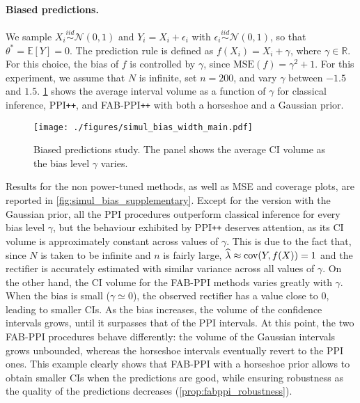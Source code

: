 \paragraph{Biased predictions.}
We sample $X_i \overset{iid}{\sim} \mathcal{N}(0,1)$ and $Y_i = X_i + \epsilon_i$ with $\epsilon_i \overset{iid}{\sim} \mathcal{N}(0, 1)$, so that $\theta^* = \mathbb{E}[Y] = 0$.
The prediction rule is defined as $f(X_i) = X_i + \gamma$, where $\gamma \in \mathbb{R}$.
For this choice, the bias of $f$ is controlled by $\gamma$, since $\text{MSE}(f) = \gamma^2 + 1$.
For this experiment, we assume that $N$ is infinite, set $n = 200$, and vary $\gamma$ between $-1.5$ and $1.5$.
\cref{fig:simul_bias_width_main} shows the average interval volume as a function of $\gamma$ for classical inference, PPI\texttt{++}, and FAB-PPI\texttt{++} with both a horseshoe and a Gaussian prior.
\begin{figure}[ht!]
    \centering
    \texttt{[image: ./figures/simul\_bias\_width\_main.pdf]}
    \caption{Biased predictions study. The panel shows the average CI volume as the bias level $\gamma$ varies.}
    \label{fig:simul_bias_width_main}
\end{figure}
Results for the non power-tuned methods, as well as MSE and coverage plots, are reported in \cref{fig:simul_bias_supplementary}.
Except for the version with the Gaussian prior, all the PPI procedures outperform classical inference for every bias level $\gamma$, but the behaviour exhibited by PPI\texttt{++} deserves attention, as its CI volume is approximately constant across values of $\gamma$.
This is due to the fact that, since $N$ is taken to be infinite and $n$ is fairly large, $\widehat\lambda \approx \mathrm{cov}(Y, f(X)) = 1$ and the rectifier is accurately estimated with similar variance across all values of $\gamma$.
On the other hand, the CI volume for the FAB-PPI methods varies greatly with $\gamma$. When the bias is small ($\gamma \simeq 0$), the observed rectifier has a value close to $0$, leading to smaller CIs.
As the bias increases, the volume of the confidence intervals grows, until it surpasses that of the PPI intervals.
At this point, the two FAB-PPI procedures behave differently: the volume of the Gaussian intervals grows unbounded, whereas the horseshoe intervals eventually revert to the PPI ones.
This example clearly shows that FAB-PPI with a horseshoe prior allows to obtain smaller CIs when the predictions are good, while ensuring robustness as the quality of the predictions decreases (\cref{prop:fabppi_robustness}). 

